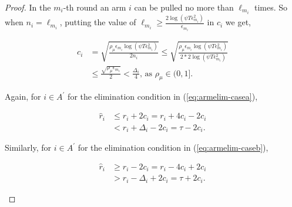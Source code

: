 \begin{proof}
In the $m_{i}$-th round an arm $i$ can be pulled no more than $\ell_{m_{i}}$ times. So when $n_{i}=\ell_{m_{i}}$, putting the value of $\ell_{m_{i}}\ge\frac{2\log{(\psi T\epsilon_{m_{i}}^{2})}}{\epsilon_{m_{i}}}$ in $c_{i}$ we get, 
\begin{small}
\begin{align*}
c_{i}&=\sqrt{\frac{\rho_{\mu}\epsilon_{m_{i}}\log (\psi T\epsilon_{m_{i}}^{2})}{2 n_{i}}}
\le\sqrt{\frac{\rho_{\mu}\epsilon_{m_{i}}\log (\psi T\epsilon_{m_{i}}^{2})}{2*2 \log(\psi T\epsilon_{m_{i}}^{2})}}\\
& \le\frac{\sqrt{\rho_{\mu}\epsilon_{m_{i}}}}{2}
 < \frac{\Delta_{i}}{4} \text{, as }\rho_{\mu}\in (0,1].
\end{align*}
\end{small}
Again, for ${i} \in A^{'}$ for the  elimination condition in (\ref{eq:armelim-casea}), 
\begin{small}
\begin{align*}
\hat{r}_{i} &\leq r_{i} + 2c_{i} = r_{i} + 4c_{i} - 2c_{i} \\
&< r_{i} + \Delta_{i} - 2c_{i} = \tau -2c_{i}.
\end{align*}
\end{small}
Similarly, for ${i} \in A^{'}$ for the  elimination condition in (\ref{eq:armelim-caseb}), 
\begin{small}
\begin{align*}
\hat{r}_{i} &\geq r_{i} - 2c_{i} = r_{i} - 4c_{i} + 2c_{i} \\
&> r_{i} - \Delta_{i} + 2c_{i}= \tau + 2c_{i}.
\end{align*}
\end{small}



\end{proof}
